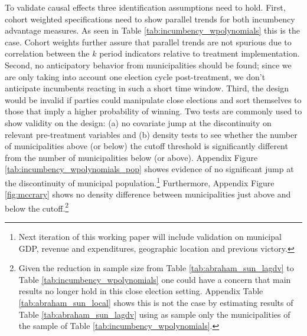 \documentclass[12pt]{amsart}
\numberwithin{equation}{section}
\theoremstyle{definition}
\theoremstyle{definition}
\theoremstyle{definition}
\begin{document}
To validate causal effects three identification assumptions need to hold. First, cohort weighted specifications need to show parallel trends for both incumbency advantage measures. As seen in Table \ref{tab:incumbency_wpolynomials}  this is the case. Cohort weights further assure that parallel trends are not spurious due to correlation between the $k$ period indicators relative to treatment implementation. Second, no anticipatory behavior from municipalities should be found; since we are only taking into account one election cycle post-treatment, we don't anticipate incumbents reacting in such a short time window. %
Third, the design would be invalid if parties could manipulate close elections and sort themselves to those that imply a higher probability of winning. Two tests are commonly used to show validity on the design: (a) no covariate jump at the discontinuity on relevant pre-treatment variables and (b) density tests to see whether the number of municipalities above (or below) the cutoff threshold is significantly different from the number of municipalities below (or above). Appendix Figure \ref{tab:incumbency_wpolynomials_pop} showes evidence of no significant jump at the discontinuity of municipal population.\footnote{Next iteration of this working paper will include validation on municipal GDP, revenue and expenditures, geographic location and previous victory.} Furthermore, Appendix Figure \ref{fig:mccrary} shows no density difference between municipalities just above and below the cutoff.\footnote{Given the reduction in sample size from Table \ref{tab:abraham_sun_lagdv} to Table \ref{tab:incumbency_wpolynomials} one could have a concern that main results no longer hold in this close election setting. Appendix Table \ref{tab:abraham_sun_local} shows this is not the case by estimating results of Table \ref{tab:abraham_sun_lagdv} using as sample only the municipalities of the sample of Table \ref{tab:incumbency_wpolynomials}.}   
\end{document}
